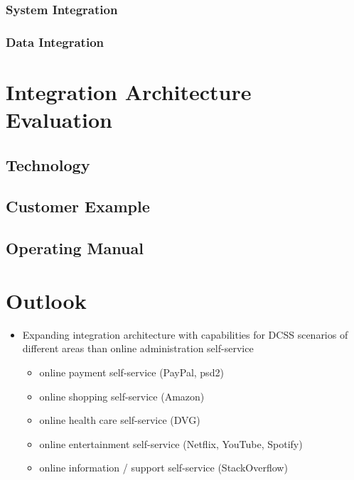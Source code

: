 \documentclass[
     12pt,         %
     a4paper,      %
     BCOR10mm,     %
     DIV14,        %
aragraph skip instad of paragraph indent
     ]{scrreprt}
\begin{document}
\subsection{System Integration}

\subsection{Data Integration}


\chapter{Integration Architecture Evaluation}

\section{Technology}

\section{Customer Example}

\section{Operating Manual}

\chapter{Outlook}

\begin{itemize}
     \item Expanding integration architecture with capabilities for DCSS scenarios of different areas than online administration self-service
     \begin{itemize}
          \item online payment self-service (PayPal, psd2)
          \item online shopping self-service (Amazon)
          \item online health care self-service (DVG)
          \item online entertainment self-service (Netflix, YouTube, Spotify)
          \item online information / support self-service (StackOverflow)
     \end{itemize}
\end{itemize}



\end{document}
